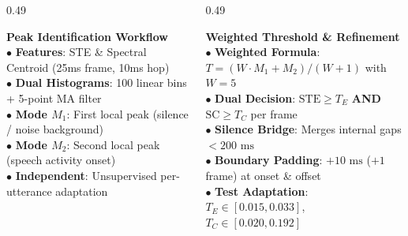 \documentclass[aspectratio=169, 10pt]{beamer}
\begin{document}
\begin{frame}
\begin{tcolorbox}[contentframe]
  \vspace{0pt}
  \begin{columns}[T, onlytextwidth]
    \begin{column}{0.49\textwidth}
      \begin{tcolorbox}[darkcard, height=3.60cm, valign=top, top=4pt, bottom=4pt, left=4pt, right=4pt]
        {\fontsize{8.5pt}{9.5pt}\selectfont\color{cyanGlow}\textbf{Peak Identification Workflow}}\\[4pt]
        {\fontsize{6.3pt}{8.0pt}\selectfont
        $\bullet$ \textbf{Features}: STE \& Spectral Centroid (25ms frame, 10ms hop)\\[2.5pt]
        $\bullet$ \textbf{Dual Histograms}: 100 linear bins + 5-point MA filter\\[2.5pt]
        $\bullet$ \textbf{Mode $M_1$}: First local peak (silence / noise background)\\[2.5pt]
        $\bullet$ \textbf{Mode $M_2$}: Second local peak (speech activity onset)\\[2.5pt]
        $\bullet$ \textbf{Independent}: Unsupervised per-utterance adaptation}
      \end{tcolorbox}
    \end{column}

    \begin{column}{0.49\textwidth}
      \begin{tcolorbox}[mintcard, height=3.60cm, valign=top, top=4pt, bottom=4pt, left=4pt, right=4pt]
        {\fontsize{8.5pt}{9.5pt}\selectfont\color{mintGreen}\textbf{Weighted Threshold \& Refinement}}\\[4pt]
        {\fontsize{6.3pt}{8.0pt}\selectfont
        $\bullet$ \textbf{Weighted Formula}: $T = (W \cdot M_1 + M_2) / (W + 1)$ with $W = 5$\\[2.5pt]
        $\bullet$ \textbf{Dual Decision}: $\text{STE} \ge T_E$ \textbf{AND} $\text{SC} \ge T_C$ per frame\\[2.5pt]
        $\bullet$ \textbf{Silence Bridge}: Merges internal gaps $< 200\text{ ms}$\\[2.5pt]
        $\bullet$ \textbf{Boundary Padding}: $+10\text{ ms}$ ($+1$ frame) at onset \& offset\\[2.5pt]
        $\bullet$ \textbf{Test Adaptation}: $T_E \in [0.015, 0.033]$, $T_C \in [0.020, 0.192]$}
      \end{tcolorbox}
    \end{column}
  \end{columns}
  \end{tcolorbox}
\end{frame}
\end{document}
